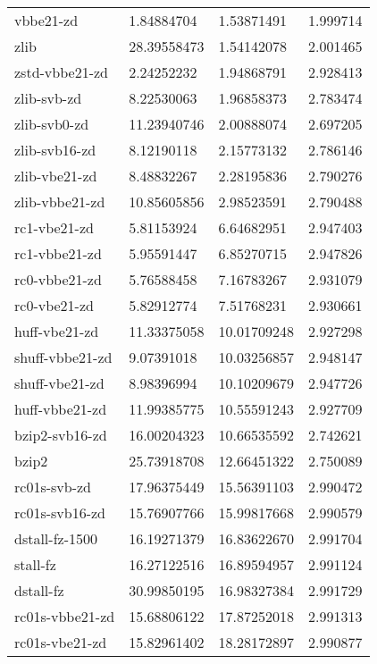 \begin{table}
\begin{tabular}{|l|l|l|l|}
          vbbe21-zd     & 1.84884704      & 1.53871491    &1.999714\\
               zlib     &28.39558473      & 1.54142078    &2.001465\\
     zstd-vbbe21-zd     & 2.24252232      & 1.94868791    &2.928413\\
        zlib-svb-zd     & 8.22530063      & 1.96858373    &2.783474\\
       zlib-svb0-zd     &11.23940746      & 2.00888074    &2.697205\\
      zlib-svb16-zd     & 8.12190118      & 2.15773132    &2.786146\\
      zlib-vbe21-zd     & 8.48832267      & 2.28195836    &2.790276\\
     zlib-vbbe21-zd     &10.85605856      & 2.98523591    &2.790488\\
		\rowcolor{lightgray}
       rc1-vbe21-zd     & 5.81153924      & 6.64682951    &2.947403\\
		\rowcolor{lightgray}
      rc1-vbbe21-zd     & 5.95591447      & 6.85270715    &2.947826\\
		\rowcolor{lightgray}
      rc0-vbbe21-zd     & 5.76588458      & 7.16783267    &2.931079\\
		\rowcolor{lightgray}
       rc0-vbe21-zd     & 5.82912774      & 7.51768231    &2.930661\\
      huff-vbe21-zd     &11.33375058      &10.01709248    &2.927298\\
		\rowcolor{lightgray}
    shuff-vbbe21-zd     & 9.07391018      &10.03256857    &2.948147\\
		\rowcolor{lightgray}
     shuff-vbe21-zd     & 8.98396994      &10.10209679    &2.947726\\
     huff-vbbe21-zd     &11.99385775      &10.55591243    &2.927709\\
     bzip2-svb16-zd     &16.00204323      &10.66535592    &2.742621\\
              bzip2     &25.73918708      &12.66451322    &2.750089\\
		\rowcolor{lightgray}
       rc01s-svb-zd     &17.96375449      &15.56391103    &2.990472\\
		\rowcolor{lightgray}
     rc01s-svb16-zd     &15.76907766      &15.99817668    &2.990579\\
		\rowcolor{lightgray}
     dstall-fz-1500     &16.19271379      &16.83622670    &2.991704\\
		\rowcolor{lightgray}
           stall-fz     &16.27122516      &16.89594957    &2.991124\\
		\rowcolor{lightgray}
          dstall-fz     &30.99850195      &16.98327384    &2.991729\\
		\rowcolor{lightgray}
    rc01s-vbbe21-zd     &15.68806122      &17.87252018    &2.991313\\
		\rowcolor{lightgray}
     rc01s-vbe21-zd     &15.82961402      &18.28172897    &2.990877\\
	\hline
    \end{tabular}
\end{table}
